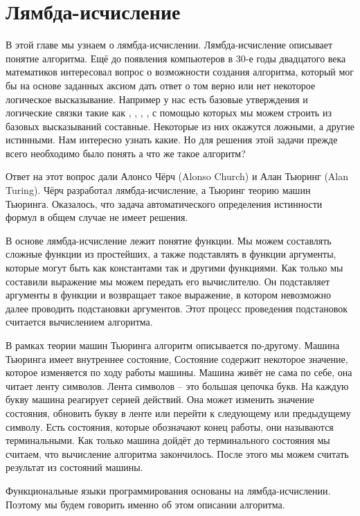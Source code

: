 \setcounter{chapter}{12}
\chapter{Лямбда-исчисление}



В этой главе мы узнаем о лямбда-исчислении. Лямбда-исчисление
описывает понятие алгоритма. 
Ещё до появления компьютеров в 30-е годы двадцатого
века математиков интересовал вопрос о возможности
создания алгоритма, который мог бы на основе заданных
аксиом дать ответ о том верно или нет некоторое 
логическое высказывание. Например у нас есть базовые утверждения
и логические связки такие как , , 
, , 
с помощью которых мы можем строить из базовых высказываний
составные. Некоторые из них окажутся ложными, а другие истинными.
Нам интересно узнать какие. Но для решения этой задачи
прежде всего необходимо было понять а что же такое 
алгоритм?

Ответ на этот вопрос дали Алонсо Чёрч (Alonso Church) и 
Алан Тьюринг (Alan Turing). Чёрч разработал лямбда-исчисление,
а Тьюринг теорию машин Тьюринга. Оказалось, что 
задача автоматического определения истинности формул
в общем случае не имеет решения. 

В основе лямбда-исчисление
лежит понятие функции. Мы можем составлять сложные функции 
из простейших, а также подставлять в функции аргументы,
которые могут быть как константами так и другими функциями.
Как только мы составили выражение мы можем передать его
вычислителю. Он подставляет аргументы в функции и
возвращает такое выражение, в котором невозможно
далее проводить подстановки аргументов. Этот процесс
проведения подстановок считается вычислением алгоритма. 

В рамках теории машин Тьюринга алгоритм описывается 
по-другому. Машина Тьюринга имеет внутреннее состояние, 
Состояние содержит некоторое значение, которое изменяется
по ходу работы машины. Машина живёт не сама по себе, она
читает ленту символов. Лента символов -- это большая цепочка
букв. На каждую букву машина реагирует серией действий.
Она может изменить значение состояния, обновить букву
в ленте или перейти к следующему или предыдущему
символу. Есть состояния, которые обозначают конец
работы, они называются терминальными. Как только машина
дойдёт до терминального состояния мы считаем, что 
вычисление алгоритма закончилось. После этого мы можем 
считать результат из состояний машины.

Функциональные языки программирования основаны на 
лямбда-исчислении. Поэтому мы будем говорить
именно об этом описании алгоритма. 

